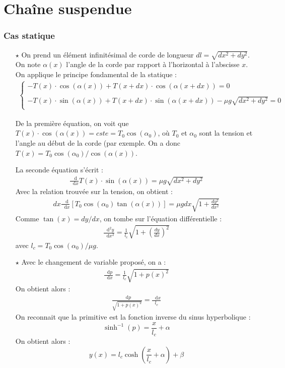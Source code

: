 \documentclass{report}
\newcommand*\dif{\mathop{}\!\mathrm{d}}
\begin{document}
\section*{Chaîne suspendue}

\subsubsection{Cas statique}

\begin{itemize}

	\item[$\star$] On prend un élément infinitésimal de corde de longueur $dl=\sqrt{dx^2+dy^2}$. On note $\alpha(x)$ l'angle de la corde par rapport à l'horizontal à l'abscisse $x$. On applique le principe fondamental de la statique :
	\begin{align*}
	\left\lbrace
	\begin{array}{ccc}
	-T(x)\cdot\cos(\alpha(x))+T(x+dx)\cdot\cos(\alpha(x+dx))=0\\
	\\
	-T(x)\cdot\sin(\alpha(x))+T(x+dx)\cdot\sin(\alpha(x+dx))-\mu g\sqrt{dx^2+dy^2}=0\\
	\end{array}\right.
	\end{align*}		
	
	De la première équation, on voit que $T(x)\cdot\cos(\alpha(x))=cste=T_0\cos(\alpha_0)$, où $T_0$ et $\alpha_0$ sont la tension et l'angle au début de la corde (par exemple. On a donc $T(x)=T_0\cos(\alpha_0)/\cos(\alpha(x))$.
	
	La seconde équation s'écrit :
	\begin{align*}
		\frac{\dif }{\dif x}T(x)\cdot\sin(\alpha(x))=\mu g \sqrt{dx^2+dy^2}
	\end{align*}
	Avec la relation trouvée sur la tension, on obtient :
	\begin{align*}
		dx\frac{\dif }{\dif x}\left[T_0\cos(\alpha_0)\tan(\alpha(x))\right] =\mu g dx\sqrt{1+\frac{dy^2}{dx^2}}
	\end{align*}
	Comme $\tan(x)=dy/dx$, on tombe sur l'équation différentielle :
	\begin{align*}
		\frac{\dif^2 y}{\dif x^2} =\frac{1}{l_c}\sqrt{1+\left( \frac{dy}{dx}\right)^2}
	\end{align*}	
	avec $l_c=T_0\cos(\alpha_0)/\mu g$.
	\item[$\star$] Avec le changement de variable proposé, on a :
	\begin{align*}
		\frac{\dif p}{\dif x} =\frac{1}{l_c}\sqrt{1+p(x)^2}
	\end{align*}	
	On obtient alors :
	\begin{align*}
		\frac{\dif p}{\sqrt{1+p(x)^2}} =\frac{\dif x}{l_c}
	\end{align*}	
	On reconnait que la primitive est la fonction inverse du sinus hyperbolique :
	\begin{equation}
		\sinh^{-1}(p)=\frac{x}{l_c} +\alpha
	\end{equation}
	On obtient alors :
	\begin{equation}
		y(x) = l_c\cosh\left( \frac{x}{l_c}+\alpha\right) +\beta
	\end{equation}
	

\end{itemize}
\end{document}
